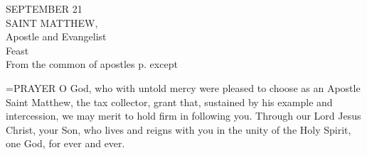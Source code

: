 \begin{center}\normalsize SEPTEMBER 21\\
\footnotesize SAINT MATTHEW,\\
\footnotesize Apostle and Evangelist\\
\footnotesize Feast\\
\footnotesize From the common of apostles p.    except	\\
\end{center}

\hangindent=\parindent \small{PRAYER 
O God, who with untold mercy
were pleased to choose as an Apostle
Saint Matthew, the tax collector,
grant that, sustained by his example and intercession,
we may merit to hold firm in following you.
Through our Lord Jesus Christ, your Son,
who lives and reigns with you in the unity of the Holy Spirit,
one God, for ever and ever.\\}
 

